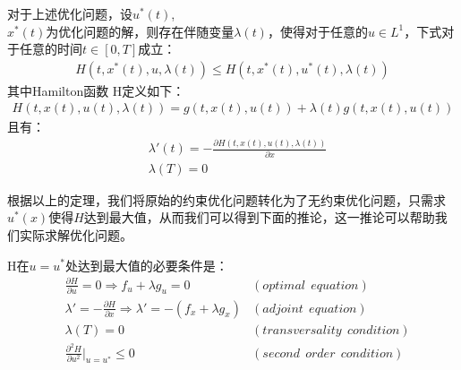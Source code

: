 \documentclass[UTF8]{ctexart}
\begin{document}
			\begin{theo}
				对于上述优化问题，设$u^*(t)$,\\ $x^*(t)$为优化问题的解，则存在伴随变量$\lambda(t)$，使得对于任意的$u\in L^1$，下式对于任意的时间$t\in[0,T]$成立：
				\begin{equation}
				\begin{aligned}
				H(t,x^*(t),u,\lambda(t))\leq H(t,x^*(t),u^*(t),\lambda(t))
				\end{aligned}
				\end{equation}
				其中Hamilton函数 H定义如下：
				\begin{equation}
				\begin{aligned}
				H(t,x(t),u(t),\lambda(t))=g(t,x(t),u(t))+\lambda(t)g(t,x(t),u(t))
				\end{aligned}
				\end{equation}
				且有：
				\begin{equation}
				\begin{aligned}
				&\lambda'(t)=-\frac{\partial H(t,x(t),u(t),\lambda(t))}{\partial x}\\
				&\lambda(T)=0
				\end{aligned}
				\end{equation}
			\end{theo}
		
		
		
		\indent 根据以上的定理，我们将原始的约束优化问题转化为了无约束优化问题，只需求$u^*(x)$使得$H$达到最大值，从而我们可以得到下面的推论，这一推论可以帮助我们实际求解优化问题。
		\begin{deduction}
			H在$u=u^*$处达到最大值的必要条件是：
			\begin{equation}
			\begin{aligned}
			&\frac{\partial H}{\partial u}=0\Rightarrow f_u+\lambda g_u =0&(optimal \ \ equation)\\
			&\lambda'=-\frac{\partial H}{\partial x}\Rightarrow \lambda'=-(f_x+\lambda g_x)&(adjoint \ \  equation)\\
			&\lambda(T)=0&(transversality \ \  condition)\\
			&\frac{\partial^2 H}{\partial u^2}\big|_{u=u^*}\leq 0&(second \ \ order \ \ condition)
			\end{aligned}
			\end{equation}	
		\end{deduction}
		
\end{document}
